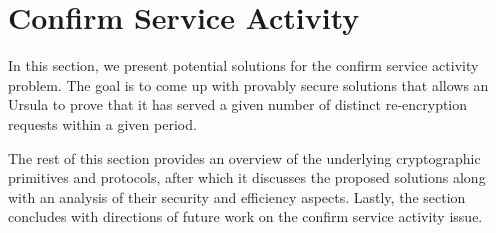 \section{Confirm Service Activity}
\label{confirm-service-actiivty}
In this section, we present potential solutions for the confirm service activity 
problem. The goal is to come up with provably secure solutions that allows an 
Ursula to prove that it has served a given number of distinct re-encryption 
requests within a given period. 


The rest of this section provides an overview of the underlying cryptographic primitives and 
protocols, after which it discusses the proposed solutions along with an analysis of 
their security and efficiency aspects. Lastly, the section concludes with directions of 
future work on the confirm service activity issue.





